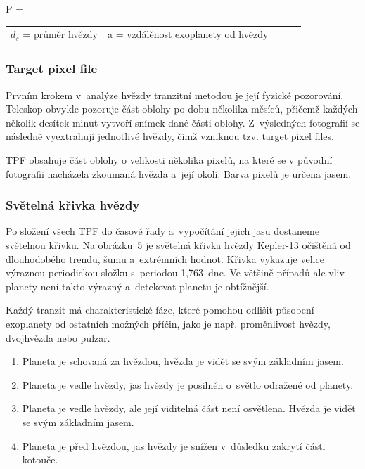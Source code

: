 \documentclass[a4paper,12pt]{article}
\begin{document}
 {P = }{
\begin{tabular}{llll}
	$d_s$ = průměr hvězdy & a = vzdálěnost exoplanety od hvězdy \
\end{tabular}
}


\subsubsection{Target pixel file}

Prvním krokem v~analýze hvězdy tranzitní metodou je její fyzické pozorování. Teleskop obvykle pozoruje část oblohy po dobu několika měsíců, přičemž každých několik desítek minut vytvoří snímek dané části oblohy. Z~výsledných fotografií se následně vyextrahují jednotlivé hvězdy, čímž vzniknou tzv. target pixel files.

TPF obsahuje část oblohy o velikosti několika pixelů, na které se v původní fotografii nacházela zkoumaná hvězda a~její okolí. Barva pixelů je určena jasem.


\subsubsection{Světelná křivka hvězdy}

Po složení všech TPF do časové řady a~vypočítání jejich jasu dostaneme světelnou křivku. Na obrázku~5 je světelná křivka hvězdy Kepler-13 očištěná od dlouhodobého trendu, šumu a~extrémních hodnot. Křivka vykazuje velice výraznou periodickou složku s~periodou 1,763~dne. Ve většině případů ale vliv planety není takto výrazný a~detekovat planetu je obtížnější.

\data{1}{nasadata}

Každý tranzit má charakteristické fáze, které pomohou odlišit působení exoplanety od ostatních možných příčin, jako je např. proměnlivost hvězdy, dvojhvězda nebo pulzar.



\begin{enumerate}
\item Planeta je schovaná za hvězdou, hvězda je vidět se svým základním jasem.
\item Planeta je vedle hvězdy, jas hvězdy je posilněn o~světlo odražené od planety.
\item Planeta je vedle hvězdy, ale její viditelná část není osvětlena. Hvězda je vidět se svým základním jasem.
\item Planeta je před hvězdou, jas hvězdy je snížen v~důsledku zakrytí části kotouče.
\end{enumerate}
\end{document}
